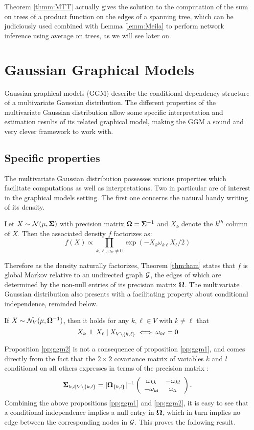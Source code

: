 Theorem \ref{thmm:MTT} actually gives the solution to the computation of the sum on trees of a product function on the edges of a spanning tree, which can be judiciously used combined with  Lemma \ref{lemm:Meila} to perform network inference using average on trees, as we will see later on. 

 \section{Gaussian Graphical Models}
 Gaussian graphical models (GGM) describe the conditional dependency structure of a  multivariate Gaussian distribution. The different properties of the multivariate Gaussian distribution allow some specific interpretation and estimation results of its related graphical model,  making the GGM a sound and very clever framework to work with.
 
 \subsection{Specific properties}
The multivariate Gaussian distribution possesses various properties which facilitate computations as well as interpretations. Two in particular are of interest in the graphical models setting. The first one concerns the natural handy writing of its density.
 \begin{prop}\label{pp:ggm1}
 Let $X\sim \mathcal{N}(\mu, {\boldsymbol{\Sigma}})$ with precision matrix ${\boldsymbol{\Omega}}={\boldsymbol{\Sigma}}^{-1}$ and $X_k$ denote the $k^{th}$ column of $X$. Then the associated density $f$ factorizes as:
 $$f(X) \propto \prod_{k,\ell, \omega_{kl}\neq 0} \exp(-X_{k}\omega_{k\ell}X_{\ell}/2)$$
 \end{prop}
 Therefore as the density naturally factorizes, Theorem \ref{thm:ham} states that $f$ is global Markov relative to an undirected graph $\mathcal{G}$, the edges of which are determined by the non-null entries of its precision matrix ${\boldsymbol{\Omega}}$.  The multivariate Gaussian distribution also presents with a facilitating property about conditional independence, reminded below.
 
 \begin{prop}\label{pp:ggm2}If  $X\sim \mathcal{N}_V(\mu, {\boldsymbol{\Omega}}^{-1})$, then it holds for any $k,\ell\in V$ with $k\neq \ell$ that
$$X_k \independent X_\ell \mid X_{V\setminus\{k,\ell\}} \iff \omega_{k\ell}=0 $$
 \end{prop}
  Proposition \ref{pp:ggm2} is not a consequence of proposition \ref{pp:ggm1}, and comes directly from the fact that the $2\times 2$  covariance matrix of variables $k$ and $l$ conditional on all others expresses in terms of the precision matrix : $${\boldsymbol{\Sigma}}_{k,l\mid V\setminus\{k,l\}} = |{\boldsymbol{\Omega}}_{\{k,l\}}|^{-1} \left(\begin{array}{cc}
\omega_{kk} & -\omega_{kl}\\
-\omega_{kl} & \omega_{ll}  
  \end{array}\right).$$
Combining the above propositions \ref{pp:ggm1} and \ref{pp:ggm2}, it is easy to see that a conditional independence implies a null entry in ${\boldsymbol{\Omega}}$, which in turn implies no edge between the corresponding nodes in $\mathcal{G}$. This proves the following result.

